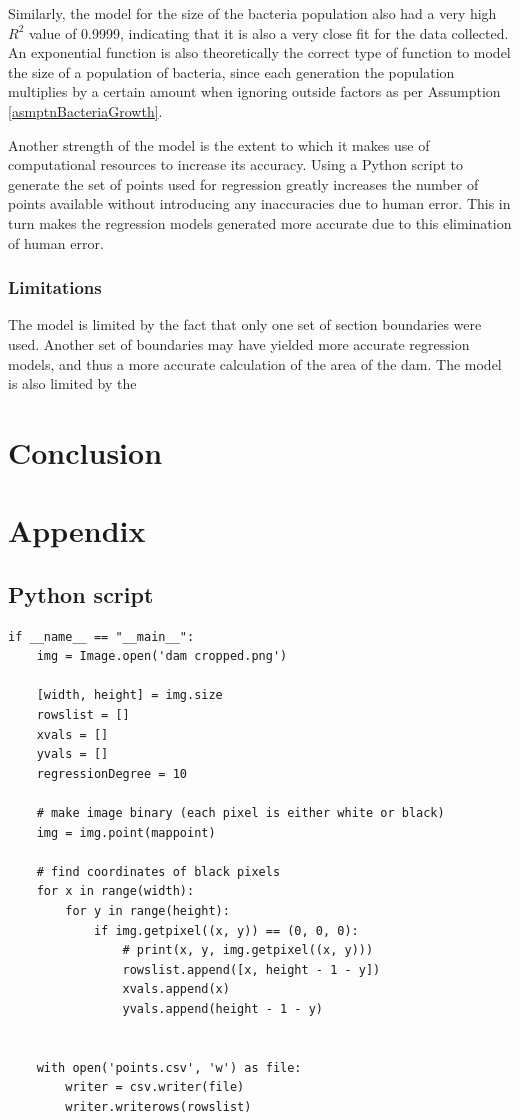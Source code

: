 \documentclass[a4paper]{article}
\theoremstyle{definition}
\begin{document}
            Similarly, the model for the size of the bacteria population also had a very high $R^2$ value of 0.9999, indicating that it is also a very close fit for the data collected. An exponential function is also theoretically the correct type of function to model the size of a population of bacteria, since each generation the population multiplies by a certain amount when ignoring outside factors as per Assumption \ref{asmptnBacteriaGrowth}.

            Another strength of the model is the extent to which it makes use of computational resources to increase its accuracy. Using a Python script to generate the set of points used for regression greatly increases the number of points available without introducing any inaccuracies due to human error. This in turn makes the regression models generated more accurate due to this elimination of human error. 


        \subsubsection{Limitations}
            The model is limited by the fact that only one set of section boundaries were used. Another set of boundaries may have yielded more accurate regression models, and thus a more accurate calculation of the area of the dam. 
            The model is also limited by the 

\section{Conclusion}


\newpage

\section{Appendix}

    \subsection{Python script}\label{secPythonMakeCoordinates}
    \begin{verbatim}
if __name__ == "__main__":
    img = Image.open('dam cropped.png')

    [width, height] = img.size
    rowslist = []
    xvals = []
    yvals = []
    regressionDegree = 10

    # make image binary (each pixel is either white or black)
    img = img.point(mappoint)

    # find coordinates of black pixels
    for x in range(width):
        for y in range(height):
            if img.getpixel((x, y)) == (0, 0, 0):
                # print(x, y, img.getpixel((x, y)))
                rowslist.append([x, height - 1 - y])
                xvals.append(x)
                yvals.append(height - 1 - y)


    with open('points.csv', 'w') as file:
        writer = csv.writer(file)
        writer.writerows(rowslist)
    \end{verbatim}
\end{document}
